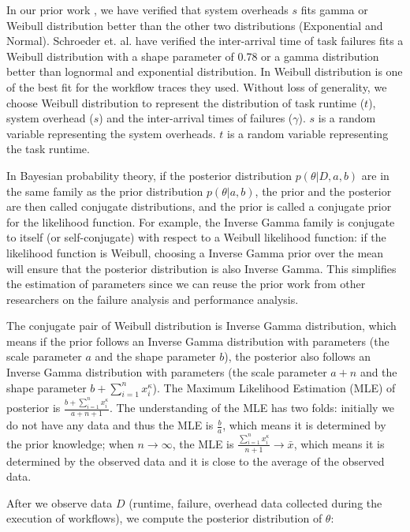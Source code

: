 \documentclass{IOS-Book-Article}
\begin{document}
In our prior work \cite{Chen2011}, we have verified that system overheads $s$ fits gamma or Weibull distribution better than the other two distributions (Exponential and Normal). Schroeder et. al. \cite{Schroeder2006} have verified the inter-arrival time of task failures fits a Weibull distribution with a shape parameter of 0.78 or a gamma distribution better than lognormal and exponential distribution. In \cite{Sun2003, Iosup2008} Weibull distribution is one of the best fit for the workflow traces they used.  Without loss of generality, we choose Weibull distribution to represent the distribution of task runtime ($t$), system overhead ($s$) and the inter-arrival times of failures ($\gamma$).  $s$ is a random variable representing the system overheads. $t$ is a random variable representing the task runtime. 

In Bayesian probability theory, if the posterior distribution $p(\theta|D, a, b)$ are in the same family as the prior distribution $p(\theta|a, b)$, the prior and the posterior are then called conjugate distributions, and the prior is called a conjugate prior for the likelihood function. For example, the Inverse Gamma family is conjugate to itself (or self-conjugate) with respect to a Weibull likelihood function: if the likelihood function is Weibull, choosing a Inverse Gamma prior over the mean will ensure that the posterior distribution is also Inverse Gamma. This simplifies the estimation of parameters since we can reuse the prior work from other researchers on the failure analysis and performance analysis. 

The conjugate pair of Weibull distribution is Inverse Gamma distribution, which means if the prior follows an Inverse Gamma distribution with parameters (the scale parameter $a$ and the shape parameter $b$), the posterior also follows an Inverse Gamma distribution with parameters (the scale parameter $a+n$ and the shape parameter $\displaystyle b+\sum_{i=1}^n{x_i^\kappa}$). The Maximum Likelihood Estimation  (MLE) of posterior is $\displaystyle\frac{b+\displaystyle\sum_{i=1}^n{x_i^\kappa}}{a+n+1}$. The understanding of the MLE has two folds: initially we do not have any data and thus the MLE is $\displaystyle\frac{b}{a}$, which means it is determined by the prior knowledge; when $n\to\infty$, the MLE is $\displaystyle\frac{\displaystyle\sum_{i=1}^n{x_i^\kappa}}{n+1}\to\bar{x}$, which means it is determined by the observed data and it is close to the average of the observed data. 

After we observe data $D$ (runtime, failure, overhead data collected during the execution of workflows), we compute the posterior distribution of $\theta$:
\end{document}
